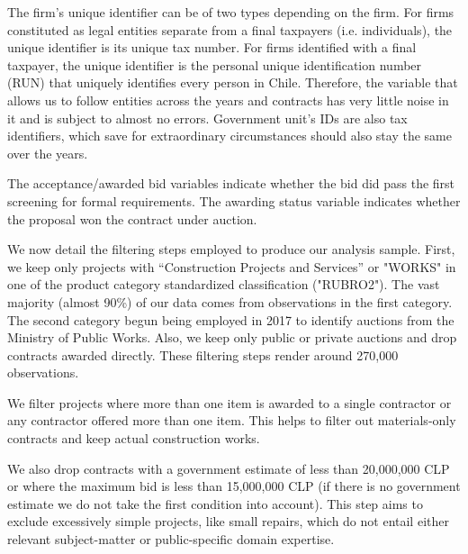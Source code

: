 
The firm's unique identifier can be of two types depending on the firm. For firms constituted as legal entities separate from a final taxpayers (i.e. individuals), the unique identifier is its unique tax number. For firms identified with a final taxpayer, the unique identifier is the personal unique identification number (RUN) that uniquely identifies every person in Chile. Therefore, the variable that allows us to follow entities across the years and contracts has very little noise in it and is subject to almost no errors. Government unit's IDs are also tax identifiers, which save for extraordinary circumstances should also stay the same over the years.

The acceptance/awarded bid variables indicate whether the bid did pass the first screening for formal requirements. The awarding status variable indicates whether the proposal won the contract under auction.

We now detail the filtering steps employed to produce our analysis sample. First, we keep only projects with “Construction Projects and Services” or "WORKS"  in one of the product category standardized classification ("RUBRO2"). The vast majority (almost 90\%) of our data comes from observations in the first category. The second category begun being employed in 2017 to identify auctions from the Ministry of Public Works. Also, we keep only public or private auctions and drop contracts awarded directly. These filtering steps render around 270,000 observations.

We filter projects where more than one item is awarded to a single contractor or any contractor offered more than one item. This helps to filter out materials-only contracts and keep actual construction works.

We also drop contracts with a government estimate of less than 20,000,000 CLP or where the maximum bid is less than 15,000,000 CLP (if there is no government estimate we do not take the first condition into account). This step aims to exclude excessively simple projects, like small repairs, which do not entail either relevant subject-matter or public-specific domain expertise.

